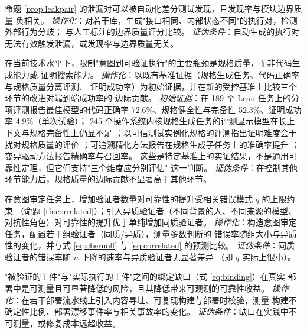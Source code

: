 \begin{hypothesis}[泄漏对可被自动发现]\label{hyp:h6}
命题 \ref{prop:leakpair} 的泄漏对可以被自动化差分测试发现，且发现率与模块边界质量
负相关。
\emph{操作化}：对若干库，生成"接口相同、内部状态不同"的执行对，检测外部行为分歧；
与人工标注的边界质量评分比较。
\emph{证伪条件}：自动生成的执行对无法有效触发泄漏，或发现率与边界质量无关。
\end{hypothesis}

\begin{hypothesis}[规格质量是当前的约束瓶颈]\label{hyp:h7}
在当前技术水平下，限制"意图到可验证执行"的主要瓶颈是规格质量，而非代码生成能力或
证明搜索能力。
\emph{操作化}：以既有基准证据（规格生成任务、代码正确率与规格质量分离评测、
证明成功率）为初始证据，并在新的受控基准上比较三个环节的改进对端到端成功率的
边际贡献。
\emph{初始证据}：在 189 个 Lean 任务上的分项评测报告最佳模型的代码正确率
72.6\%、规格健全性与完备性 52.3\%、证明成功率 4.9\%（单次试验）\cite{verina2026}；
245 个操作系统内核规格生成任务的评测显示模型在长上下文与规格完备性上仍显不足
\cite{osvbench2026}；以可信测试实例化规格的评测指出证明难度会干扰对规格质量的评价
\cite{coins2026}；可追溯精化方法报告在规格生成子任务上的准确率提升
\cite{verispecgen2026}；变异驱动方法报告精确率与召回率\cite{specsyn2026}。
这些是特定基准上的实证结果，不是通用可靠性定理，但它们支持"三个维度应分别评估"
这一判断。
\emph{证伪条件}：在控制其他环节能力后，规格质量的边际贡献不显著高于其他环节。
\end{hypothesis}

\begin{hypothesis}[共识可靠性受相关错误模式支配]\label{hyp:h8}
在意图审定任务上，增加验证者数量对可靠性的提升受相关错误模式 $q$ 的上限约束
（命题 \ref{th:correlated}）；引入异质验证者（不同背景的人、不同来源的模型、
对抗性角色）对可靠性的提升优于单纯增加同质验证者。
\emph{操作化}：构造意图审定任务，配置若干组验证者（同质/异质），测量多数判断的
错误率随组大小与异质性的变化，并与式 \eqref{eq:chernoff} 与 \eqref{eq:correlated}
的预测比较。
\emph{证伪条件}：同质验证者的错误率随 $n$ 下降的速率与异质验证者无显著差异
（即 $q$ 实际上很小）。
\end{hypothesis}

\begin{hypothesis}[制品绑定缺口是可测量的风险]\label{hyp:h9}
"被验证的工件"与"实际执行的工件"之间的绑定缺口（式 \eqref{eq:binding}）在真实
部署中是可测量且可显著降低的风险，且其降低带来可观测的可靠性收益。
\emph{操作化}：在若干部署流水线上引入内容寻址、可复现构建与部署时校验，测量
构建不确定性比例、部署漂移事件率与相关事故率的变化。
\emph{证伪条件}：缺口在实践中不可测量，或修复成本远超收益。
\end{hypothesis}

